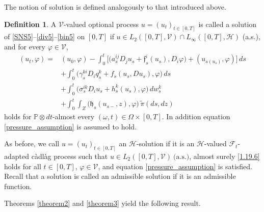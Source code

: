 \documentclass[11pt,reqno]{amsart}
\theoremstyle{definition}
\newtheorem{definition}{Definition}[section]
\theoremstyle{remark}
\newcommand\frf{\mathfrak{f}}
\newcommand\frh{\mathfrak{h}}
\newcommand\cF{\mathcal{F}}
\newcommand\cH{\mathcal{H}}
\newcommand\cV{\mathcal{V}}
\newcommand{\<}{\langle}
\renewcommand{\>}{\rangle}
\begin{document}
The notion of solution is defined analogously to that introduced above. 
\begin{definition}
                                                            \label{definition2}
A $\cV$-valued optional process
$u=(u_t)_{t\in[0,T]}$
is called a solution of \eqref{SNS5}--\eqref{div5}--\eqref{bin5} on $[0,T]$ if
$u\in L_2([0,T],\cV)\cap L_\infty([0,T],\cH)$ (a.s.),  
and for every $\varphi\in\cV$, 
\begin{align}
(u_t,\varphi)=&(u_0,\varphi)-
\int_0^t\Big[\big(a_s^{ij}D_j u_s+\frf_s^i(u_s),D_i \varphi\big)
+(u_{s(u_s)},\varphi)\Big]\,ds                                                                   \nonumber\\
&+\int_0^t\big(\gamma_s^{ki}D_i q_s^k+f_s(u_s,Du_s),\varphi\big)\,ds  \nonumber\\
&+\int_0^t\big(\sigma_s^{ik}D_i u_s+h_s^k(u_s),\varphi\big)\,dw_s^k    \nonumber\\
&+\int_0^{t}\int_{Z}\big(\frh_s(u_{s-},z),\varphi\big)\,\tilde\pi(ds,dz)                       \label{1.19.6}
\end{align}
holds for $\mathbb P\otimes dt$-almost every
$(\omega,t)\in\Omega\times[0,T]$. In addition 
equation \eqref{pressure_assumption} is assumed to hold. 

As before, we call
$u=(u_t)_{t\in[0,T]}$
an $\cH$-solution if it is an $\cH$-valued 
$\cF_t$-adapted c\`adl\`ag process such that
$u\in L_2([0,T],\cV)\ \text{(a.s.)}$, 
almost surely \eqref{1.19.6} holds for all
$t\in[0,T],\,\varphi\in\mathcal V$, 
and equation \eqref{pressure_assumption} is satisfied. 
Recall that a solution is called an admissible solution if it is 
an admissible function. 
\end{definition} 

Theorems \ref{theorem2} and \ref{theorem3} yield 
the following result. 
\end{document}
